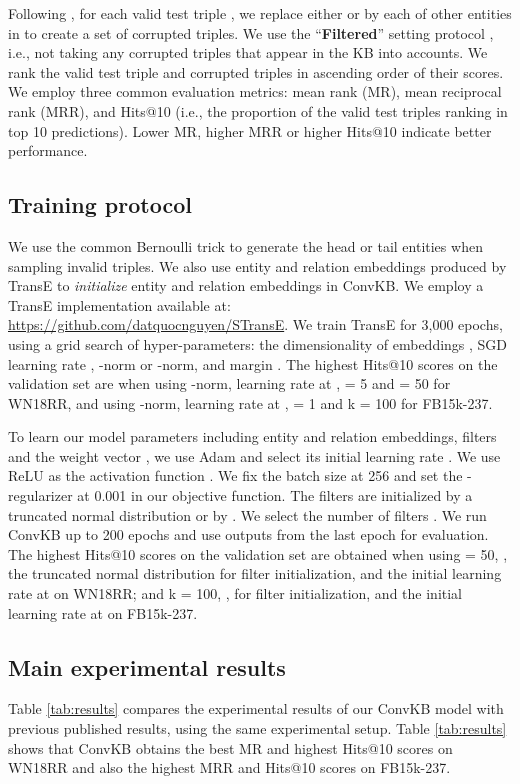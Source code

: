 \documentclass[11pt,a4paper]{article}
\begin{document}
Following \citet{NIPS2013_5071}, for each valid test triple , we replace either  or  by each of other entities in  to create a set of corrupted triples.
We use the ``\textbf{Filtered}'' setting protocol \citep{NIPS2013_5071}, i.e., not taking  any corrupted triples that appear in the KB into accounts.
We rank the valid test triple and corrupted triples in ascending order of their scores.
We employ three common evaluation metrics: mean rank (MR), mean reciprocal rank (MRR), and Hits@10 (i.e., the proportion of the valid test triples ranking in top 10 predictions). 
Lower MR, higher MRR or higher Hits@10 indicate better  performance.

\subsection{Training protocol}
We use the common Bernoulli trick \citep{AAAI148531,AAAI159571} to generate the head or tail entities when sampling invalid triples. We also use entity and relation embeddings produced by TransE to \textit{initialize} entity and relation embeddings in ConvKB. We employ a  TransE implementation available at: \url{https://github.com/datquocnguyen/STransE}.  
We train TransE  for 3,000 epochs,
 using a grid search of hyper-parameters: the dimensionality of embeddings , SGD learning rate , -norm or -norm, and margin . 
The highest Hits@10 scores  on the validation set are when using -norm, learning rate at ,  = 5 and  = 50 for WN18RR, and using -norm, learning rate at ,   = 1 and k = 100 for FB15k-237.

To learn our model parameters including entity and relation embeddings, filters  and the weight vector , we use  Adam \citep{kingma2014adam}  and select its initial learning rate . We use ReLU as the activation function . 
We fix the batch size at 256 and set  the -regularizer  at 0.001 in our objective function.
The filters  are initialized by a truncated normal distribution or by .
We select the number of filters .
We run ConvKB up to 200 epochs and use  outputs from the last epoch for evaluation. 
The highest Hits@10 scores on the validation set are obtained when using  = 50, , the truncated normal distribution for filter initialization, 
and the initial learning rate at  on WN18RR; and k = 100, ,  for filter initialization, and the initial learning rate at  on FB15k-237. 


\subsection{Main experimental results}
Table \ref{tab:results} compares the experimental results of our ConvKB model with previous published results, using the same experimental setup. Table \ref{tab:results} shows that ConvKB obtains the best MR and highest Hits@10 scores on WN18RR and also the highest MRR and Hits@10 scores on FB15k-237. 
\end{document}
